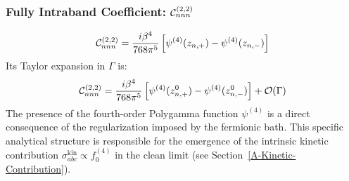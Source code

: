 \documentclass[twocolumn, prx, reprint, amsfonts, amsmath, amssymb, longbibliography, floatfix, aps]{revtex4-2}
\begin{document}
\subsubsection{Fully Intraband Coefficient: \texorpdfstring{${\cal C}_{nnn}^{(2, 2)}$}{Cnnn}}
\label{Fully-Intraband-Coefficient}
\begin{align}
{\cal C}_{nnn}^{(2, 2)} = \frac{i \beta^4}{768 \pi^5} \left[ \psi^{(4)}(z_{n,+}) - \psi^{(4)}(z_{n,-}) \right]
\end{align}
Its Taylor expansion in $\Gamma$ is:
\begin{align}
{\cal C}_{nnn}^{(2, 2)} = \frac{i \beta^4}{768 \pi^5} \left[ \psi^{(4)}(z_{n,+}^0) - \psi^{(4)}(z_{n,-}^0) \right] + {\cal O}(\Gamma)
\end{align}
The presence of the fourth-order Polygamma function $\psi^{(4)}$ is a direct consequence of the regularization imposed by the fermionic bath. This specific analytical structure is responsible for the emergence of the intrinsic kinetic contribution $\sigma_{a b c}^{\text{kin}} \propto f_0^{(4)}$ in the clean limit (see Section~\ref{A-Kinetic-Contribution}).
\end{document}
